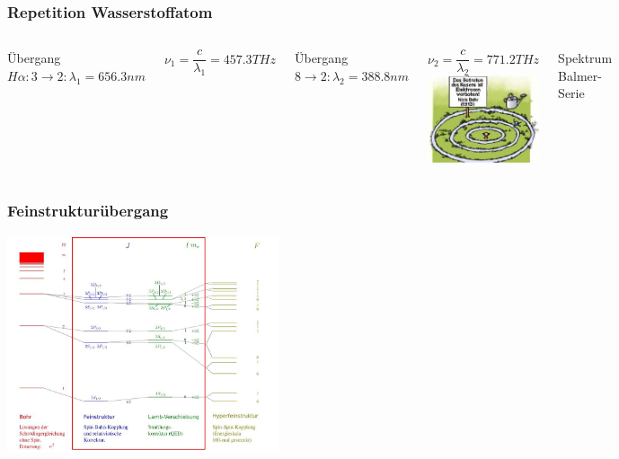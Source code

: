 \begin{frame}
	\frametitle{Repetition Wasserstoffatom}
	\begin{columns}

	Übergang $H\alpha: 3 \rightarrow 2: \lambda_1 = 656.3nm$
		 	
		 	$\nu_1 = \dfrac{c}{\lambda_1} = 457.3 THz $
		 	\vspace{.5cm}
		 	
		 	Übergang $8 \rightarrow 2: \lambda_2 = 388.8nm$
		 	
		 	$\nu_2 = \dfrac{c}{\lambda_2} = 771.2 THz$
	\includegraphics[width = 5cm]{./pictures/verbot}
	
	Spektrum Balmer-Serie

	\includegraphics[width = 5cm]{./pictures/wasserstoffSpektrum}
				
	\end{columns}
\end{frame}


\begin{frame}
	\frametitle {Feinstrukturübergang}

	\begin{center}
		\includegraphics[width = 8cm]{./pictures/energieniveaus2}
	\end{center}
	
\end{frame}


